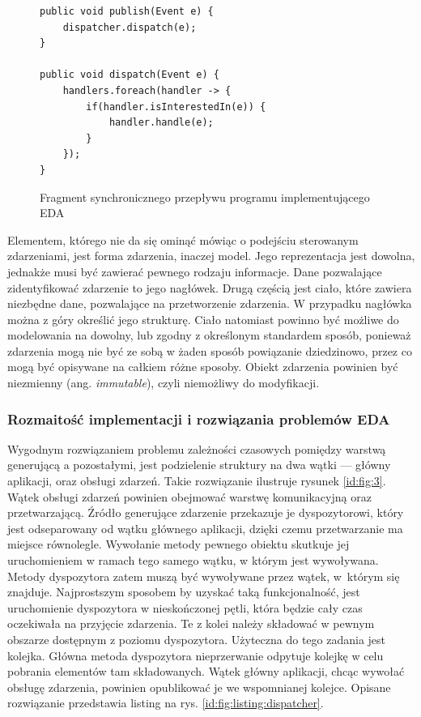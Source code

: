 \documentclass[a4paper]{book}
\newcommand{\obcy}[2]{{\selectlanguage{#1}#2}}
\newcommand{\ang}[1]{\emph{\obcy{british}{#1}}}
\begin{document}
{\begin{figure}
\begin{lstlisting}
public void publish(Event e) {
	dispatcher.dispatch(e);
}

public void dispatch(Event e) {
	handlers.foreach(handler -> {
		if(handler.isInterestedIn(e)) {
			handler.handle(e);
		}
	});
}
\end{lstlisting}
\caption{Fragment synchronicznego przepływu programu implementującego EDA}
\label{id:fig:listingEDA1}
\end{figure}

Elementem, którego nie da się ominąć mówiąc o podejściu sterowanym zdarzeniami, jest forma zdarzenia, inaczej model. Jego reprezentacja jest dowolna, jednakże musi być zawierać pewnego rodzaju informacje. Dane pozwalające zidentyfikować zdarzenie to jego nagłówek. Drugą częścią jest ciało, które zawiera niezbędne dane, pozwalające na przetworzenie zdarzenia. W przypadku nagłówka można z góry określić jego strukturę. Ciało natomiast powinno być możliwe do modelowania na dowolny, lub zgodny z określonym standardem sposób, ponieważ zdarzenia mogą nie być ze sobą w żaden sposób powiązanie dziedzinowo, przez co mogą być opisywane na całkiem różne sposoby. Obiekt zdarzenia powinien być niezmienny (ang. \ang{immutable}), czyli niemożliwy do modyfikacji.

\subsubsection{Rozmaitość implementacji i rozwiązania problemów EDA}

Wygodnym rozwiązaniem problemu zależności czasowych pomiędzy warstwą generującą a pozostałymi, jest podzielenie struktury na dwa wątki --- główny aplikacji, oraz obsługi zdarzeń. Takie rozwiązanie ilustruje rysunek \ref{id:fig:3}. Wątek obsługi zdarzeń powinien obejmować warstwę komunikacyjną oraz przetwarzającą. Źródło generujące zdarzenie przekazuje je dyspozytorowi, który jest odseparowany od wątku głównego aplikacji, dzięki czemu przetwarzanie ma miejsce równolegle. Wywołanie metody pewnego obiektu skutkuje jej uruchomieniem w ramach tego samego wątku, w którym jest wywoływana. Metody dyspozytora zatem muszą być wywoływane przez wątek, w~którym się znajduje. Najprostszym sposobem by uzyskać taką funkcjonalność, jest uruchomienie dyspozytora w nieskończonej pętli, która będzie cały czas oczekiwała na przyjęcie zdarzenia. Te z kolei należy składować w pewnym obszarze dostępnym z poziomu dyspozytora. Użyteczna do tego zadania jest kolejka. Główna metoda dyspozytora nieprzerwanie odpytuje kolejkę w celu pobrania elementów tam składowanych. Wątek główny aplikacji, chcąc wywołać obsługę zdarzenia, powinien opublikować je we wspomnianej kolejce. Opisane rozwiązanie przedstawia listing na rys. \ref{id:fig:listing:dispatcher}.

}
\end{document}
